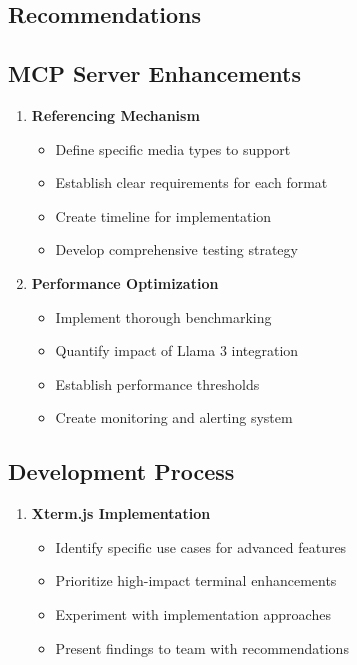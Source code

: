 \documentclass[10pt,a4paper]{article}
\begin{document}
\begin{multicols}{2}
\section*{Recommendations}

\subsection*{MCP Server Enhancements}
\begin{enumerate}\small
  \item \textbf{Referencing Mechanism}
    \begin{itemize}
      \item Define specific media types to support
      \item Establish clear requirements for each format
      \item Create timeline for implementation
      \item Develop comprehensive testing strategy
    \end{itemize}
  
  \item \textbf{Performance Optimization}
    \begin{itemize}
      \item Implement thorough benchmarking
      \item Quantify impact of Llama 3 integration
      \item Establish performance thresholds
      \item Create monitoring and alerting system
    \end{itemize}
\end{enumerate}

\subsection*{Development Process}
\begin{enumerate}\small
  \item \textbf{Xterm.js Implementation}
    \begin{itemize}
      \item Identify specific use cases for advanced features
      \item Prioritize high-impact terminal enhancements
      \item Experiment with implementation approaches
      \item Present findings to team with recommendations
    \end{itemize}
  

\end{enumerate}
\end{multicols}
\end{document}
